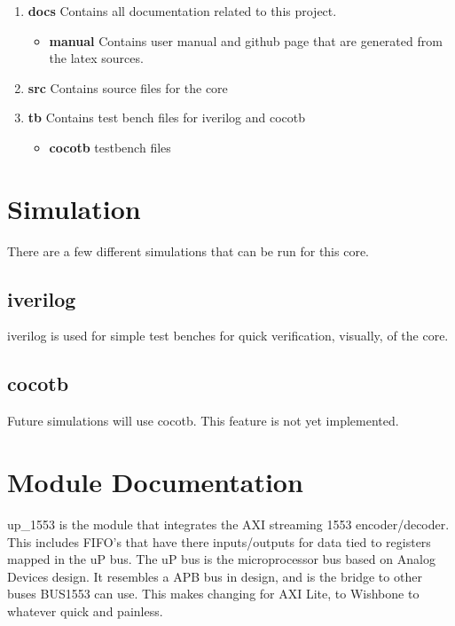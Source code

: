 \begin{enumerate}
  \item \textbf{docs} Contains all documentation related to this project.
    \begin{itemize}
      \item \textbf{manual} Contains user manual and github page that are generated from the latex sources.
    \end{itemize}
  \item \textbf{src} Contains source files for the core
  \item \textbf{tb} Contains test bench files for iverilog and cocotb
    \begin{itemize}
      \item \textbf{cocotb} testbench files
    \end{itemize}
\end{enumerate}

\newpage

\section{Simulation}
\par
There are a few different simulations that can be run for this core.

\subsection{iverilog}
\par
iverilog is used for simple test benches for quick verification, visually, of the core.

\subsection{cocotb}
\par
Future simulations will use cocotb. This feature is not yet implemented.

\newpage

\section{Module Documentation} \label{Module Documentation}

\par
up\_1553 is the module that integrates the AXI streaming 1553 encoder/decoder.
This includes FIFO's that have there inputs/outputs for data tied to registers mapped in the uP bus.
The uP bus is the microprocessor bus based on Analog Devices design. It resembles a APB bus in design,
and is the bridge to other buses BUS1553 can use. This makes changing for AXI Lite, to Wishbone to whatever
quick and painless.

